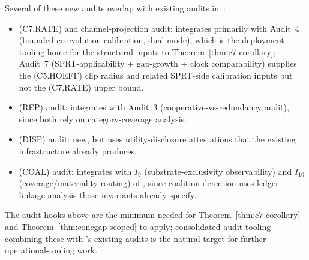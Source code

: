 Several of these new audits overlap with existing audits
in~\citep[\S 8]{lasser2026paper10}:
\begin{itemize}
\item (C7.RATE) and channel-projection audit: integrates
  primarily with Audit~4 (bounded co-evolution
  calibration, dual-mode), which is the deployment-tooling home
  for the structural inputs to
  Theorem~\ref{thm:c7-corollary}; Audit~7 (SPRT-applicability +
  gap-growth + clock comparability) supplies the (C5.HOEFF) clip
  radius and related SPRT-side calibration inputs but not the
  (C7.RATE) upper bound.
\item (REP) audit: integrates with Audit~3
  (cooperative-vs-redundancy audit), since both rely on
  category-coverage analysis.
\item (DISP) audit: new, but uses utility-disclosure attestations
  that the existing infrastructure already produces.
\item (COAL) audit: integrates with $I_9$
  (substrate-exclusivity observability) and $I_{10}$
  (coverage/materiality routing) of \citep[Deployment Safety]{lasser2026paper10},
  since coalition detection uses ledger-linkage analysis those
  invariants already specify.
\end{itemize}

The audit hooks above are the minimum needed for
Theorem~\ref{thm:c7-corollary} and Theorem~\ref{thm:concgap-scoped}
to apply; consolidated audit-tooling combining these with
\citep[\S 8]{lasser2026paper10}'s existing audits is the natural
target for further operational-tooling work.
